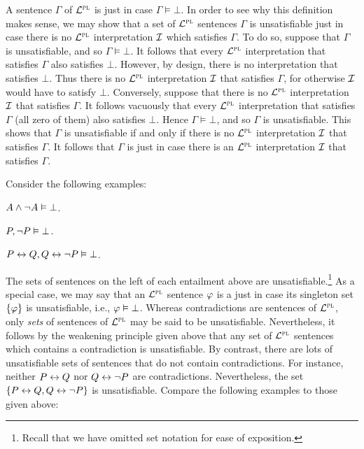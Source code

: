 A sentence $\Gamma$ of $\mathcal{L}^{\textsc{pl}}$ is  just in case $\Gamma \models \bot$.
In order to see why this definition makes sense, we may show that a set of $\mathcal{L}^{\textsc{pl}}$ sentences $\Gamma$ is unsatisfiable just in case there is no $\mathcal{L}^{\textsc{pl}}$ interpretation $\mathcal{I}$ which satisfies $\Gamma$.
To do so, suppose that $\Gamma$ is unsatisfiable, and so $\Gamma \models \bot$.
It follows that every $\mathcal{L}^{\textsc{pl}}$ interpretation that satisfies $\Gamma$ also satisfies $\bot$.
However, by design, there is no interpretation that satisfies $\bot$.
Thus there is no $\mathcal{L}^{\textsc{pl}}$ interpretation $\mathcal{I}$ that satisfies $\Gamma$, for otherwise $\mathcal{I}$ would have to satisfy $\bot$.
Conversely, suppose that there is no $\mathcal{L}^{\textsc{pl}}$ interpretation $\mathcal{I}$ that satisfies $\Gamma$.
It follows vacuously that every $\mathcal{L}^{\textsc{pl}}$ interpretation that satisfies $\Gamma$ (all zero of them) also satisfies $\bot$.
Hence $\Gamma \models \bot$, and so $\Gamma$ is unsatisfiable.
This shows that $\Gamma$ is unsatisfiable if and only if there is no $\mathcal{L}^{\textsc{pl}}$ interpretation $\mathcal{I}$ that satisfies $\Gamma$.
It follows that $\Gamma$ is  just in case there is an $\mathcal{L}^{\textsc{pl}}$ interpretation $\mathcal{I}$ that satisfies $\Gamma$.

Consider the following examples:

\begin{earg}
\item[] $A \wedge \neg A \vDash \bot$.
\item[] $P, \neg P \vDash \bot$.
\item[] $P \leftrightarrow Q, Q \leftrightarrow\neg P \vDash \bot$.
\end{earg}

The sets of sentences on the left of each entailment above are unsatisfiable.\footnote{Recall that we have omitted set notation for ease of exposition.}
As a special case, we may say that an $\mathcal{L}^{\textsc{pl}}$ sentence $\varphi$ is a  just in case its singleton set $\lbrace\varphi\rbrace$ is unsatisfiable, i.e., $\varphi \vDash \bot$.
Whereas contradictions are sentences of $\mathcal{L}^{\textsc{pl}}$, only \textit{sets} of sentences of $\mathcal{L}^{\textsc{pl}}$ may be said to be unsatisfiable.
Nevertheless, it follows by the weakening principle given above that any set of $\mathcal{L}^{\textsc{pl}}$ sentences which contains a contradiction is unsatisfiable.
By contrast, there are lots of unsatisfiable sets of sentences that do not contain contradictions.
For instance, neither $P \leftrightarrow Q$ nor $Q \leftrightarrow \neg P$ are contradictions. 
Nevertheless, the set $\lbrace P \leftrightarrow Q, Q \leftrightarrow \neg P\rbrace$ is unsatisfiable. 
Compare the following examples to those given above:

